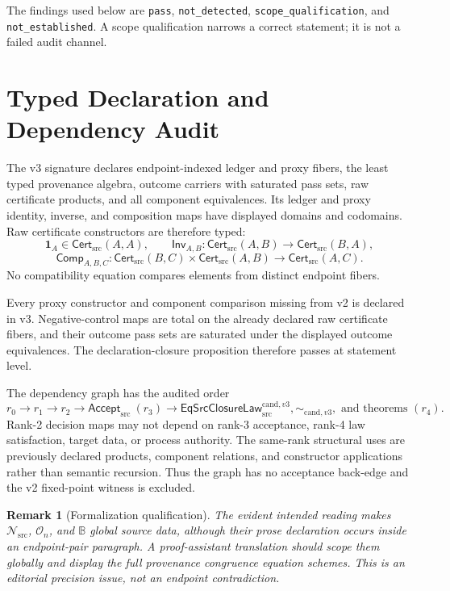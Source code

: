 \documentclass[11pt]{article}
\newtheorem{remark}{Remark}
\newcommand{\Cert}{\mathsf{Cert}_{\mathrm{src}}}
\newcommand{\Accept}{\mathsf{Accept}_{\mathrm{src}}}
\newcommand{\Law}{\mathsf{EqSrcClosureLaw}^{\mathrm{cand},v3}_{\mathrm{src}}}
\begin{document}
The findings used below are \texttt{pass}, \texttt{not\_detected},
\texttt{scope\_qualification}, and \texttt{not\_established}. A scope
qualification narrows a correct statement; it is not a failed audit channel.

\section{Typed Declaration and Dependency Audit}

The v3 signature declares endpoint-indexed ledger and proxy fibers, the least
typed provenance algebra, outcome carriers with saturated pass sets, raw
certificate products, and all component equivalences. Its ledger and proxy
identity, inverse, and composition maps have displayed domains and codomains.
Raw certificate constructors are therefore typed:
\[
 \mathbf 1_A\in\Cert(A,A),\qquad
 \mathsf{Inv}_{A,B}:\Cert(A,B)\to\Cert(B,A),
\]
\[
 \mathsf{Comp}_{A,B,C}:
 \Cert(B,C)\times\Cert(A,B)\to\Cert(A,C).
\]
No compatibility equation compares elements from distinct endpoint fibers.

Every proxy constructor and component comparison missing from v2 is declared
in v3. Negative-control maps are total on the already declared raw certificate
fibers, and their outcome pass sets are saturated under the displayed outcome
equivalences. The declaration-closure proposition therefore passes at
statement level.

The dependency graph has the audited order
\[
 r_0\longrightarrow r_1\longrightarrow r_2
 \longrightarrow \Accept\ (r_3)
 \longrightarrow \Law,\sim_{\mathrm{cand},v3},
 \text{ and theorems }(r_4).
\]
Rank-2 decision maps may not depend on rank-3 acceptance, rank-4 law
satisfaction, target data, or process authority. The same-rank structural
uses are previously declared products, component relations, and constructor
applications rather than semantic recursion. Thus the graph has no acceptance
back-edge and the v2 fixed-point witness is excluded.

\begin{remark}[Formalization qualification]
The evident intended reading makes \(\mathcal N_{\mathrm{src}}\),
\(\mathcal O_n\), and \(\mathbb B\) global source data, although their prose
declaration occurs inside an endpoint-pair paragraph. A proof-assistant
translation should scope them globally and display the full provenance
congruence equation schemes. This is an editorial precision issue, not an
endpoint contradiction.
\end{remark}
\end{document}

